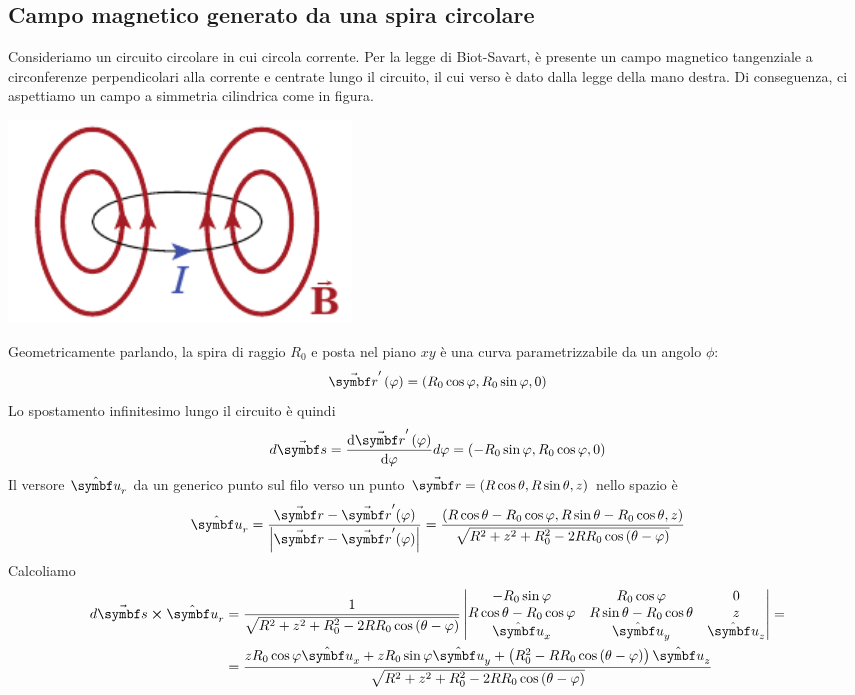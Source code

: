 \subsection{Campo magnetico generato da una spira circolare}
Consideriamo un circuito circolare in cui circola corrente. Per la legge di Biot-Savart, è presente un campo magnetico tangenziale a circonferenze perpendicolari alla corrente e centrate lungo il circuito, il cui verso è dato dalla legge della mano destra. Di conseguenza, ci aspettiamo un campo a simmetria cilindrica come in figura.
\begin{center}
	\includegraphics[width=0.4\textwidth]{images/chp8/chp8spiracampomagnetico.pdf}
\end{center}
Geometricamente parlando, la spira di raggio $R_0$ e posta nel piano $xy$ è una curva parametrizzabile da un angolo $\phi$:
\begin{equation*}
	\vba{r}'\left(\phi\right)=\left(R_0\cos\phi,R_0\sin\phi,0\right)
\end{equation*}
Lo spostamento infinitesimo lungo il circuito è quindi
\begin{equation*}
	d\vba{s}=\dv{\vba{r}'\left(\phi\right)}{\phi}d\phi=\left(-R_0\sin\phi,R_0\cos\phi,0\right)
\end{equation*}
Il versore $\vbh{u}_r$ da un generico punto sul filo verso un punto $\vba{r}=\left(R\cos\theta,R\sin\theta,z\right)$ nello spazio è
\begin{equation*}
	\vbh{u}_r=\frac{\vba{r}-\vba{r}'(\phi)}{\abs{\vba{r}-\vba{r}'(\phi)}}=\frac{\left(R\cos\theta-R_0\cos\phi,R\sin\theta-R_0\cos\theta,z\right)}{\sqrt{R^2+z^2+R_0^2-2RR_0\cos\left(\theta-\phi\right)}}
\end{equation*}
Calcoliamo
\begin{align*}
	d\vba{s}\cross\vbh{u}_r&=\frac{1}{\sqrt{R^2+z^2+R_0^2-2RR_0\cos\left(\theta-\phi\right)}}
	\begin{vmatrix}
		-R_0\sin\phi & R_0\cos\phi & 0\\
		R\cos\theta-R_0\cos\phi & R\sin\theta-R_0\cos\theta & z\\
		\vbh{u}_x & \vbh{u}_y & \vbh{u}_z 
	\end{vmatrix}
	=\\
	&=\frac{zR_0\cos\phi\vbh{u}_x+zR_0\sin\phi\vbh{u}_y+\left(R_0^2-RR_0\cos\left(\theta-\phi\right)\right)\vbh{u}_z}{\sqrt{R^2+z^2+R_0^2-2RR_0\cos\left(\theta-\phi\right)}}
\end{align*}
